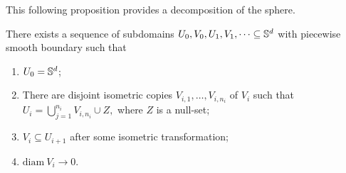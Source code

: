 This following proposition provides a decomposition of the sphere.
\begin{proposition}
  \label{prop:C_SphereDecomp}
  There exists a sequence of subdomains $U_0,V_0,U_1,V_1,\dots \subseteq \mathbb{S}^d$ with piecewise smooth boundary such that
  \begin{enumerate}[(1)]
    \item $U_0 = \mathbb{S}^d$;
    \item There are disjoint isometric copies $V_{i,1},\dots,V_{i,n_i}$ of $V_i$ such that
    $U_i = \bigcup_{j=1}^{n_i} V_{i,n_i} \cup Z,$
    where $Z$ is a null-set;
    \item $V_i \subseteq U_{i+1}$ after some isometric transformation;
    \item $\mathrm{diam}~V_i \to 0$.
  \end{enumerate}
\end{proposition}
